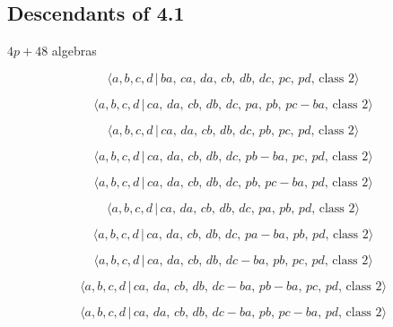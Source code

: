 \documentclass[10pt]{article}
\begin{document}
\subsection{Descendants of 4.1}

$4p+48$ algebras

\begin{equation}
\langle a,b,c,d\,|\,ba,\,ca,\,da,\,cb,\,db,\,dc,\,pc,\,pd,\,\text{class }%
2\rangle  \tag{6.9}
\end{equation}

\begin{equation}
\langle a,b,c,d\,|\,ca,\,da,\,cb,\,db,\,dc,\,pa,\,pb,\,pc-ba,\,\text{class }%
2\rangle  \tag{6.10}
\end{equation}

\begin{equation}
\langle a,b,c,d\,|\,ca,\,da,\,cb,\,db,\,dc,\,pb,\,pc,\,pd,\,\text{class }%
2\rangle  \tag{6.11}
\end{equation}

\begin{equation}
\langle a,b,c,d\,|\,ca,\,da,\,cb,\,db,\,dc,\,pb-ba,\,pc,\,pd,\,\text{class }%
2\rangle  \tag{6.12}
\end{equation}

\begin{equation}
\langle a,b,c,d\,|\,ca,\,da,\,cb,\,db,\,dc,\,pb,\,pc-ba,\,pd,\,\text{class }%
2\rangle  \tag{6.13}
\end{equation}

\begin{equation}
\langle a,b,c,d\,|\,ca,\,da,\,cb,\,db,\,dc,\,pa,\,pb,\,pd,\,\text{class }%
2\rangle  \tag{6.14}
\end{equation}

\begin{equation}
\langle a,b,c,d\,|\,ca,\,da,\,cb,\,db,\,dc,\,pa-ba,\,pb,\,pd,\,\text{class }%
2\rangle  \tag{6.15}
\end{equation}

\begin{equation}
\langle a,b,c,d\,|\,ca,\,da,\,cb,\,db,\,dc-ba,\,pb,\,pc,\,pd,\,\text{class }%
2\rangle  \tag{6.16}
\end{equation}

\begin{equation}
\langle a,b,c,d\,|\,ca,\,da,\,cb,\,db,\,dc-ba,\,pb-ba,\,pc,\,pd,\,\text{
class }2\rangle  \tag{6.17}
\end{equation}

\begin{equation}
\langle a,b,c,d\,|\,ca,\,da,\,cb,\,db,\,dc-ba,\,pb,\,pc-ba,\,pd,\,\text{
class }2\rangle  \tag{6.18}
\end{equation}
\end{document}
